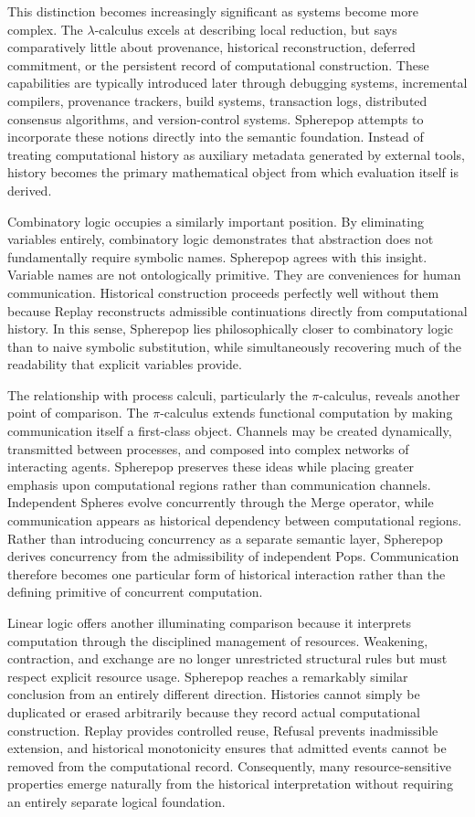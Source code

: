 \documentclass[12pt,oneside]{article}
\theoremstyle{definition}
\theoremstyle{remark}
\begin{document}
This distinction becomes increasingly significant as systems become more
complex. The $\lambda$-calculus excels at describing local reduction, but says
comparatively little about provenance, historical reconstruction, deferred
commitment, or the persistent record of computational construction. These
capabilities are typically introduced later through debugging systems,
incremental compilers, provenance trackers, build systems, transaction logs,
distributed consensus algorithms, and version-control systems. Spherepop
attempts to incorporate these notions directly into the semantic foundation.
Instead of treating computational history as auxiliary metadata generated by
external tools, history becomes the primary mathematical object from which
evaluation itself is derived.

Combinatory logic occupies a similarly important position. By eliminating
variables entirely, combinatory logic demonstrates that abstraction does not
fundamentally require symbolic names. Spherepop agrees with this insight.
Variable names are not ontologically primitive. They are conveniences for
human communication. Historical construction proceeds perfectly well without
them because Replay reconstructs admissible continuations directly from
computational history. In this sense, Spherepop lies philosophically closer to
combinatory logic than to naive symbolic substitution, while simultaneously
recovering much of the readability that explicit variables provide.

The relationship with process calculi, particularly the $\pi$-calculus,
reveals another point of comparison. The $\pi$-calculus extends functional
computation by making communication itself a first-class object. Channels may
be created dynamically, transmitted between processes, and composed into
complex networks of interacting agents. Spherepop preserves these ideas while
placing greater emphasis upon computational regions rather than communication
channels. Independent Spheres evolve concurrently through the Merge operator,
while communication appears as historical dependency between computational
regions. Rather than introducing concurrency as a separate semantic layer,
Spherepop derives concurrency from the admissibility of independent Pops.
Communication therefore becomes one particular form of historical interaction
rather than the defining primitive of concurrent computation.

Linear logic offers another illuminating comparison because it interprets
computation through the disciplined management of resources. Weakening,
contraction, and exchange are no longer unrestricted structural rules but must
respect explicit resource usage. Spherepop reaches a remarkably similar
conclusion from an entirely different direction. Histories cannot simply be
duplicated or erased arbitrarily because they record actual computational
construction. Replay provides controlled reuse, Refusal prevents inadmissible
extension, and historical monotonicity ensures that admitted events cannot be
removed from the computational record. Consequently, many resource-sensitive
properties emerge naturally from the historical interpretation without
requiring an entirely separate logical foundation.
\end{document}
